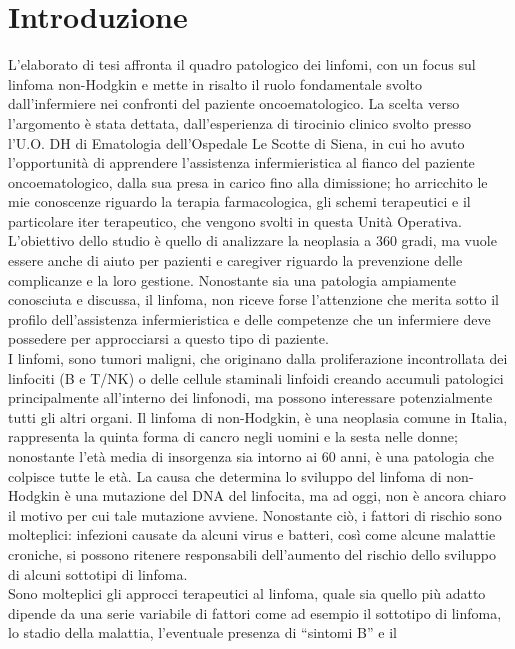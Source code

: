 \section*{Introduzione}
   
L’elaborato di tesi affronta il quadro patologico dei linfomi, con un focus sul linfoma non-Hodgkin e mette in risalto 
il ruolo fondamentale svolto dall’infermiere nei confronti del paziente oncoematologico.
La scelta verso l’argomento è stata dettata, dall’esperienza di tirocinio clinico svolto presso l’U.O. DH di Ematologia 
dell’Ospedale Le Scotte di Siena, in cui ho avuto l’opportunità di apprendere l’assistenza infermieristica al fianco del 
paziente oncoematologico, dalla sua presa in carico fino alla dimissione; ho arricchito le mie conoscenze riguardo la 
terapia farmacologica, gli schemi terapeutici e il particolare iter  terapeutico, che vengono svolti in questa Unità Operativa.\\
L’obiettivo dello studio è quello di analizzare la neoplasia a 360 gradi, ma vuole essere anche di aiuto per pazienti e 
caregiver riguardo la prevenzione delle complicanze e la loro gestione. Nonostante sia una patologia ampiamente conosciuta e 
discussa, il linfoma, non riceve forse l’attenzione che merita sotto il profilo dell’assistenza infermieristica e delle 
competenze che un infermiere deve possedere per approcciarsi a questo tipo di paziente.\\
I linfomi, sono tumori maligni, che originano dalla proliferazione incontrollata dei linfociti (B e T/NK) o delle cellule 
staminali linfoidi creando accumuli patologici principalmente all’interno dei linfonodi, ma possono interessare 
potenzialmente tutti gli altri organi. Il linfoma di non-Hodgkin, è una neoplasia comune in Italia, rappresenta la quinta 
forma di cancro negli uomini e la sesta nelle donne; nonostante l’età media di insorgenza sia intorno ai 60 anni, è una 
patologia che colpisce tutte le età. La causa che determina lo sviluppo del linfoma di non-Hodgkin è una mutazione del DNA del 
linfocita, ma ad oggi, non è ancora chiaro il motivo per cui tale mutazione avviene. Nonostante  ciò, i fattori di rischio 
sono molteplici: infezioni causate da alcuni virus e batteri, così come alcune malattie croniche, si possono ritenere 
responsabili dell’aumento del rischio dello sviluppo di alcuni sottotipi di linfoma.\\
Sono molteplici gli approcci terapeutici al linfoma, quale sia quello più adatto dipende da una serie variabile di fattori 
come ad esempio il sottotipo di linfoma, lo stadio della malattia, l'eventuale presenza di “sintomi B” e il 
